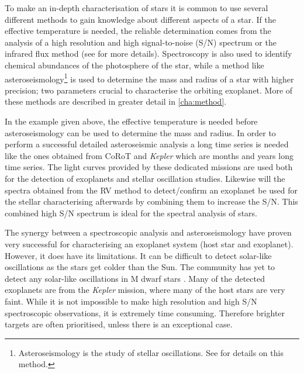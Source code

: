 To make an in-depth characterisation of stars it is common to use several different methods to gain
knowledge about different aspects of a star. If the effective temperature is needed, the reliable
determination comes from the analysis of a high resolution and high signal-to-noise (S/N) spectrum
or the infrared flux method (see  for more details). Spectroscopy is also used to
identify chemical abundances of the photosphere of the star, while a method like
asteroseismology\footnote{Asteroseismology is the study of stellar oscillations. See
 for details on this method.} is used to determine the mass and radius of
a star with higher precision; two parameters crucial to characterise the orbiting exoplanet. More of
these methods are described in greater detail in \cref{cha:method}.

In the example given above, the effective temperature is needed before asteroseismology can be used
to determine the mass and radius. In order to perform a successful detailed asteroseismic analysis a
long time series is needed like the ones obtained from CoRoT and \emph{Kepler} which are months and
years long time series. The light curves provided by these dedicated missions are used both for the
detection of exoplanets and stellar oscillation studies. Likewise will the spectra obtained from the
RV method to detect/confirm an exoplanet be used for the stellar characterising afterwards by
combining them to increase the S/N. This combined high S/N spectrum is ideal for the spectral
analysis of stars.

The synergy between a spectroscopic analysis and asteroseismology have proven very successful
\citep[see e.g.][]{Huber2013} for characterising an exoplanet system (host star and exoplanet).
However, it does have its limitations. It can be difficult to detect solar-like oscillations as the
stars get colder than the Sun. The community has yet to detect any solar-like oscillations in M
dwarf stars \citep{Rodriguez2016,Berdinas2017}. Many of the detected exoplanets are from the
\emph{Kepler} mission, where many of the host stars are very faint. While it is not impossible to
make high resolution and high S/N spectroscopic observations, it is extremely time consuming.
Therefore brighter targets are often prioritised, unless there is an exceptional case.

